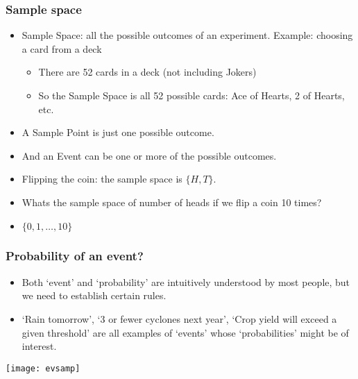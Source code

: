 \begin{frame}
\frametitle{Sample space }
\begin{itemize}
\item  
Sample Space: all the possible outcomes of an experiment. Example: choosing a card from a deck 
\begin{itemize}
\item There are 52 cards in a deck (not including Jokers) 
\item So  the  Sample  Space  is  all  52  possible  cards:  {Ace  of  Hearts,  2  of 
Hearts, etc. } 
\end{itemize}
\item A Sample Point is just one possible outcome. 
\item And an Event can be one or more of the possible outcomes. 
\item Flipping the coin:  the sample space is  $\{H,T\}$.

\item Whats the sample space of number of heads if we flip a coin 10 times?

\item $\{0,1,\ldots,10\}$

\end{itemize}
\end{frame}

\begin{frame}
\frametitle{Probability of an event? }
\begin{itemize}
\item  Both `event' and `probability' are intuitively understood by most 
people, but we need to establish certain rules. 
\item  `Rain tomorrow', `3 or fewer cyclones next year', `Crop yield will 
exceed a given threshold' are  all examples of `events' whose 
`probabilities' might be of interest. 
\end{itemize}

\begin{center}
\texttt{[image: evsamp]}
\end{center}
\end{frame}


